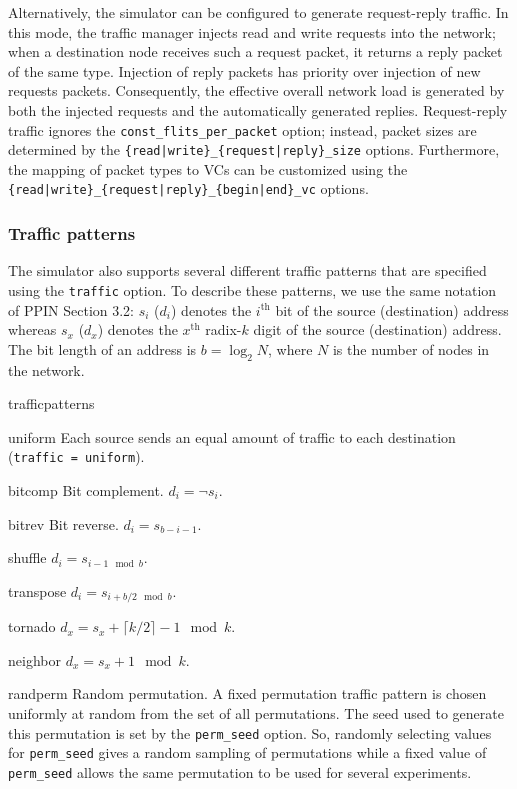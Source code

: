 \documentclass[11pt]{article}
\begin{document}
Alternatively, the simulator can be configured to generate request-reply 
traffic. In this mode, the traffic manager injects read and write requests 
into the network; when a destination node receives such a request 
packet, it returns a reply packet of the same type. Injection of reply 
packets has priority over injection of new requests packets. 
Consequently, the effective overall network load is generated by both 
the injected requests and the automatically generated replies. 
Request-reply traffic ignores the \texttt{const\_flits\_per\_packet} 
option; instead, packet sizes are determined by the 
\texttt{\{read|write\}\_\{request|reply\}\_size} options. Furthermore, 
the mapping of packet types to VCs can be customized using the 
\texttt{\{read|write\}\_\{request|reply\}\_\{begin|end\}\_vc} options.

\subsubsection{Traffic patterns}
The simulator also supports several different traffic patterns that
are specified using the \texttt{traffic} option.  To describe these
patterns, we use the same notation of PPIN Section 3.2: $s_i$ ($d_i$)
denotes the $i^\textrm{th}$ bit of the source (destination) address
whereas $s_x$ ($d_x$) denotes the $x^\textrm{th}$ radix-$k$ digit of
the source (destination) address.  The bit length of an address is $b
= \log_2 N$, where $N$ is the number of nodes in the network.

\begin{opt_list}{trafficpatterns}
\item[uniform] Each source sends an equal amount of traffic to each
destination (\texttt{traffic = uniform}).
\item[bitcomp] Bit complement. $d_i = \neg s_i$.
\item[bitrev] Bit reverse. $d_i = s_{b-i-1}$.
\item[shuffle] $d_i = s_{i-1 \mod b}$.
\item[transpose] $d_i = s_{i+b/2 \mod b}$.
\item[tornado] $d_x = s_x + \lceil k/2 \rceil - 1 \mod k$.
\item[neighbor] $d_x = s_x + 1 \mod k$.
\item[randperm] Random permutation.  A fixed permutation traffic
pattern is chosen uniformly at random from the set of all
permutations.  The seed used to generate this permutation is set by
the \texttt{perm\_seed} option.  So, randomly selecting values for
\texttt{perm\_seed} gives a random sampling of permutations while a
fixed value of \texttt{perm\_seed} allows the same permutation to be
used for several experiments.
\end{opt_list}
\end{document}
